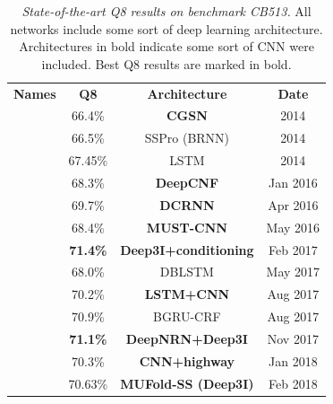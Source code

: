 	\begin{table}
		\begin{tabular}{cccc}
			\textbf{Names} & \textbf{Q8} & \textbf{Architecture} & \textbf{Date} \\
			\cite{Zhou2014}	& 66.4\% 	& \textbf{CGSN} 			& 2014 \\ 
			\cite{Magnan2014} & 66.5\% & SSPro (BRNN) & 2014 \\
			\cite{Sønderby2014}	& 67.45\% 	& LSTM 			& 2014 	\\ 
			\cite{Wang2016} & 68.3\% & \textbf{DeepCNF} 	& Jan 2016 \\ 
			\cite{Li2016}	& 69.7\% 	& \textbf{DCRNN} 		& Apr 2016 \\
			\cite{Lin2016} 	& 68.4\% 	& \textbf{MUST-CNN} 		& May 2016 \\
			\cite{Busia2017}& \textbf{71.4\%}& \textbf{Deep3I+conditioning}& Feb 2017 \\
			\cite{Hattori2017} & 68.0\%	& DBLSTM		& May 2017 \\
			\cite{Jurtz2017} & 70.2\%	& \textbf{LSTM+CNN} 		& Aug 2017 \\
			\cite{Johansen2017} & 70.9\% & BGRU-CRF & Aug 2017 \\
			\cite{8371925} & \textbf{71.1\%} & \textbf{DeepNRN+Deep3I} & Nov 2017 \\
			\cite{Zhou2018} & 70.3\% & \textbf{CNN+highway} & Jan 2018 \\
			\cite{Fang2017}& 70.63\% & \textbf{MUFold-SS (Deep3I)}&Feb 2018\\
		\end{tabular}
		\label{tab:HoF}
		\caption{\textit{State-of-the-art Q8 results on benchmark CB513.} All networks include some sort of deep learning architecture. Architectures in bold indicate some sort of CNN were included. Best Q8 results are marked in bold.}
	\end{table}